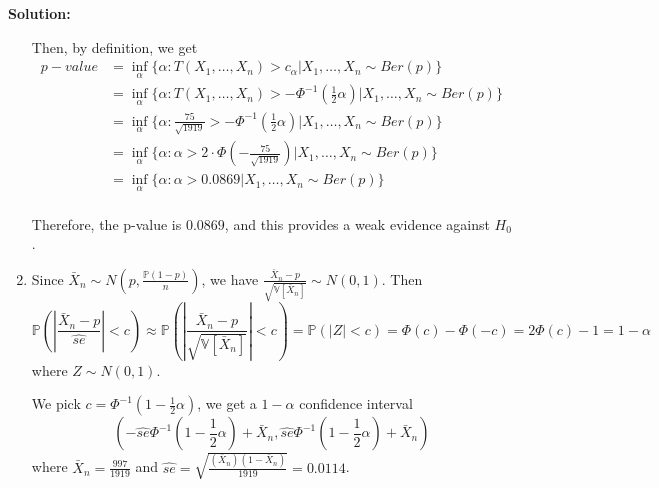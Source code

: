 \documentclass[13pt]{article}
\theoremstyle{definition}
\newenvironment{solution}
{\color{C2}\begin{framed}\begingroup\textbf{Solution:} }
  {\endgroup\end{framed}}
\theoremstyle{remark}
\newcommand{\PP}{\mathbb{P}}
\newcommand{\VV}{\mathbb{V}}
\begin{document}
\begin{solution}
\begin{enumerate}[label=(\alph*),topsep=0pt]
    Then, by definition, we get
    \begin{align*}
        p-value &= \inf_{\alpha}\{\alpha:T(X_1, \ldots, X_n)>c_{\alpha}\Big|X_1, \ldots, X_n\sim Ber(p)\}\\
        &= \inf_{\alpha}\{\alpha:T(X_1, \ldots, X_n)>-\Phi^{-1}\left(\frac{1}{2}\alpha\right)\Big|X_1, \ldots, X_n\sim Ber(p)\}\\
        &= \inf_{\alpha}\{\alpha:\frac{75}{\sqrt{1919}}>-\Phi^{-1}\left(\frac{1}{2}\alpha\right)\Big|X_1, \ldots, X_n\sim Ber(p)\}\\
         &= \inf_{\alpha}\{\alpha:\alpha > 2\cdot \Phi\left(-\frac{75}{\sqrt{1919}}\right)\Big|X_1, \ldots, X_n\sim Ber(p)\}\\
         &= \inf_{\alpha}\{\alpha:\alpha > 0.0869\Big|X_1, \ldots, X_n\sim Ber(p)\}\\
    \end{align*}
    
    Therefore, the p-value is $0.0869$, and this provides a weak evidence against $H_0$.
    \item Since $\bar{X}_n\sim N\left(p, \frac{\PP(1-p)}{n}\right)$, we have $\frac{\bar{X}_n -p}{\sqrt{\VV[\bar{X}_n]}}\sim N(0,1)$.
    Then
    \[
    \PP\left(\left|\frac{\bar{X}_n -p}{\hat{se}}\right|<c\right)\approx\PP\left(\left|\frac{\bar{X}_n -p}{\sqrt{\VV[\bar{X}_n]}}\right|<c\right)=\PP\left(\left|Z\right|<c\right)=\Phi(c)-\Phi(-c)=2\Phi(c)-1=1-\alpha
    \]
    where $Z\sim N(0,1)$.
    
    We pick $c=\Phi^{-1}\left(1-\frac{1}{2}\alpha\right)$, we get a $1-\alpha$ confidence interval
    \[
    \left(-\hat{se}\Phi^{-1}\left(1-\frac{1}{2}\alpha\right)+\bar{X}_n, \hat{se}\Phi^{-1}\left(1-\frac{1}{2}\alpha\right)+\bar{X}_n\right)
    \]
    where $\bar{X}_n=\frac{997}{1919}$ and $\hat{se}=\sqrt{\frac{(\bar{X}_n)(1-\bar{X}_n)}{1919}}=0.0114$.
    \end{enumerate}
\end{solution}
\end{document}
